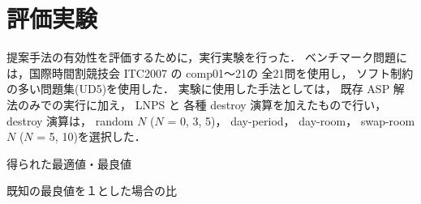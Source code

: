\section{評価実験}
提案手法の有効性を評価するために，実行実験を行った．
ベンチマーク問題には，国際時間割競技会 ITC2007 の comp01〜21の
全21問を使用し，
ソフト制約の多い問題集(UD5)を使用した．
実験に使用した手法としては，
既存 ASP 解法のみでの実行に加え，
LNPS と 各種 destroy 演算を加えたもので行い，
destroy 演算は，
random $N$ ($N$ = 0, 3, 5)，
day-period，
day-room，
swap-room $N$ ($N$ = 5, 10)を選択した．


\begin{table*}[tbp]
  \label{table:bench:result1}
  \begin{center}
  \caption{得られた最適値・最良値}
\begin{tableA}
    
  \end{tableA}
  \end{center}
\end{table*}

\begin{table*}[tbp]
  \label{table:bench:result2}
  \centering
   \caption{既知の最良値を１とした場合の比}
  \begin{tableB}
    
  \end{tableB}
\end{table*}